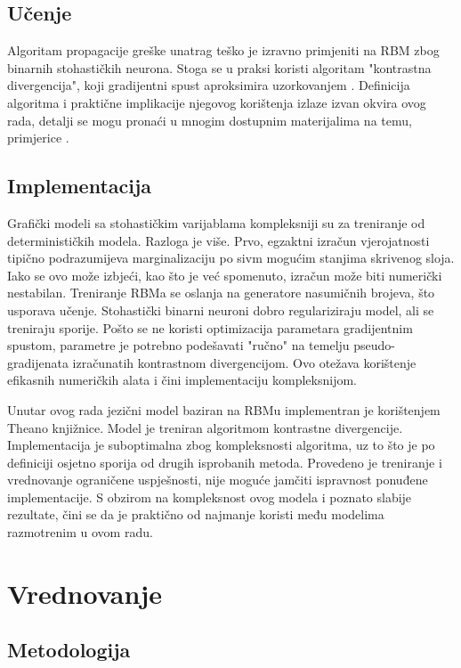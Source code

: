\documentclass[times, utf8, diplomski, numeric]{fer}
\begin{document}
\section{Učenje}

Algoritam propagacije greške unatrag teško je izravno primjeniti na RBM zbog binarnih stohastičkih neurona. Stoga se u praksi koristi algoritam "kontrastna divergencija", koji gradijentni spust aproksimira uzorkovanjem \cite{hinton_2002_cd}. Definicija algoritma i praktične implikacije njegovog korištenja izlaze izvan okvira ovog rada, detalji se mogu pronaći u mnogim dostupnim materijalima na temu, primjerice \cite{stamenkovic2014}.

\section{Implementacija}

Grafički modeli sa stohastičkim varijablama kompleksniji su za treniranje od determinističkih modela. Razloga je više. Prvo, egzaktni izračun vjerojatnosti tipično podrazumijeva marginalizaciju po sivm mogućim stanjima skrivenog sloja. Iako se ovo može izbjeći, kao što je već spomenuto, izračun može biti numerički nestabilan. Treniranje RBMa se oslanja na generatore nasumičnih brojeva, što usporava učenje. Stohastički binarni neuroni dobro regulariziraju model, ali se treniraju sporije. Pošto se ne koristi optimizacija parametara gradijentnim spustom, parametre je potrebno podešavati "ručno" na temelju pseudo-gradijenata izračunatih kontrastnom divergencijom. Ovo otežava korištenje efikasnih numeričkih alata i čini implementaciju kompleksnijom.

Unutar ovog rada jezični model baziran na RBMu implementran je korištenjem Theano knjižnice. Model je treniran algoritmom kontrastne divergencije. Implementacija je suboptimalna zbog kompleksnosti algoritma, uz to što je po definiciji osjetno sporija od drugih isprobanih metoda. Provedeno je treniranje i vrednovanje ograničene uspješnosti, nije moguće jamčiti ispravnost ponuđene implementacije. S obzirom na kompleksnost ovog modela i poznato slabije rezultate, čini se da je praktično od najmanje koristi među modelima razmotrenim u ovom radu.

\chapter{Vrednovanje}
\label{sec:eval}

\section{Metodologija}
\end{document}
